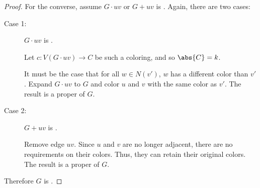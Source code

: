 \begin{proof}
  For the converse, assume \(G\cdot uv\) or \(G+uv\) is .  Again, there are two cases:
  \begin{description}
  \item [Case 1:] \(G\cdot uv\) is .

    Let \(c:V(G\cdot uv)\to C\) be such a coloring, and so \(\abs{C}=k\).

    It must be the case that for all \(w\in N(v')\), \(w\) has a different color than \(v'\).  Expand \(G\cdot uv\)
    to \(G\) and color \(u\) and \(v\) with the same color as \(v'\).  The result is a proper  of
    \(G\).
    
  \item [Case 2:] \(G+uv\) is .

    Remove edge \(uv\).  Since \(u\) and \(v\) are no longer adjacent, there are no requirements on their colors.
    Thus, they can retain their original colors.  The result is a proper  of \(G\).
  \end{description}

  Therefore \(G\) is .
\end{proof}
